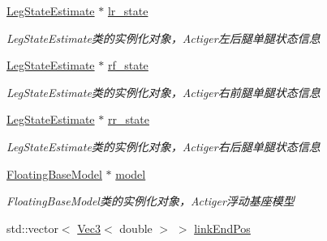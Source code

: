 \begin{DoxyCompactItemize}
\mbox{\label{classquadruped_1_1RobotModel_a0b9faefa80940c98abbf949a5c57cdc0}} 
\hyperlink{classquadruped_1_1LegStateEstimate}{Leg\+State\+Estimate} $\ast$ \hyperlink{classquadruped_1_1RobotModel_a0b9faefa80940c98abbf949a5c57cdc0}{lr\+\_\+state}
\begin{DoxyCompactList}\small\item\em Leg\+State\+Estimate类的实例化对象，\+Actiger左后腿单腿状态信息 \end{DoxyCompactList}\item 
\mbox{\label{classquadruped_1_1RobotModel_abb56f8b26639f4539674ea1d8eddfcf9}} 
\hyperlink{classquadruped_1_1LegStateEstimate}{Leg\+State\+Estimate} $\ast$ \hyperlink{classquadruped_1_1RobotModel_abb56f8b26639f4539674ea1d8eddfcf9}{rf\+\_\+state}
\begin{DoxyCompactList}\small\item\em Leg\+State\+Estimate类的实例化对象，\+Actiger右前腿单腿状态信息 \end{DoxyCompactList}\item 
\mbox{\label{classquadruped_1_1RobotModel_a3858b5cb9a17ee30e97cfc42592e6ddc}} 
\hyperlink{classquadruped_1_1LegStateEstimate}{Leg\+State\+Estimate} $\ast$ \hyperlink{classquadruped_1_1RobotModel_a3858b5cb9a17ee30e97cfc42592e6ddc}{rr\+\_\+state}
\begin{DoxyCompactList}\small\item\em Leg\+State\+Estimate类的实例化对象，\+Actiger右后腿单腿状态信息 \end{DoxyCompactList}\item 
\mbox{\label{classquadruped_1_1RobotModel_a8ca2aa086785b2b68728423f827bb520}} 
\hyperlink{classquadruped_1_1FloatingBaseModel}{Floating\+Base\+Model} $\ast$ \hyperlink{classquadruped_1_1RobotModel_a8ca2aa086785b2b68728423f827bb520}{model}
\begin{DoxyCompactList}\small\item\em Floating\+Base\+Model类的实例化对象，\+Actiger浮动基座模型 \end{DoxyCompactList}\item 
\mbox{\label{classquadruped_1_1RobotModel_abc20ce9528115ff86b113daa34e04834}} 
std\+::vector$<$ \hyperlink{cppTypes_8h_a65c27bf97693676535dd0b30ea0ad399}{Vec3}$<$ double $>$ $>$ \hyperlink{classquadruped_1_1RobotModel_abc20ce9528115ff86b113daa34e04834}{link\+End\+Pos}

\end{DoxyCompactItemize}
